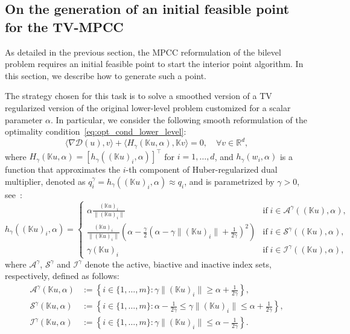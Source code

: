 \documentclass[review,onefignum,onetabnum]{siamonline190516}
\newcommand{\R}{\mathbb{R}}
\newcommand{\Ical}{\mathcal{I}}
\newcommand{\Acal}{\mathcal{A}}
\newcommand{\Dcal}{\mathcal{D}}
\newcommand{\scalar}[2]{\langle #1 , #2 \rangle}
\begin{document}
\subsection{On the generation of an initial feasible point for the TV-MPCC}\label{subsec:tv_initial_feasible}
As detailed in the previous section, the MPCC reformulation of the bilevel problem requires an initial feasible point to start the interior point algorithm. In this section, we describe how to generate such a point.

The strategy chosen for this task is to solve a smoothed version of a TV regularized version of the original lower-level problem customized for a scalar parameter $\alpha$. In particular, we consider the following smooth reformulation of the optimality condition~\cref{eq:opt_cond_lower_level}:
\begin{equation*}
    \scalar{\nabla \Dcal(u)}{v} + \scalar{H_\gamma(\mathbb{K}u,\alpha)}{\mathbb{K}v} = 0,
    \quad\forall v\in\R^d,
\end{equation*}
where $H_\gamma(\mathbb{K}u,\alpha) = [h_\gamma((\mathbb{K}u)_i,\alpha)]^\top$ for $i=1,\ldots,d$, and $h_\gamma(w_i,\alpha)$ is a function that approximates the $i$-th component of Huber-regularized dual multiplier, denoted as $q_i^\gamma = h_\gamma((\mathbb{K}u)_i,\alpha)\approx q_i$, and is parametrized by $\gamma>0$, see~\cite{de2012optimization}:
\begin{equation*}
    h_\gamma((\mathbb{K}u)_i,\alpha)=
    \begin{cases}
          \alpha\frac{(\mathbb{K}u)_i}{\|(\mathbb{K}u)_i\|}&\text{if}\;i\in\mathcal{A}^{\gamma}((\mathbb{K}u),\alpha), \\
          \frac{(\mathbb{K}u)_i}{\|(\mathbb{K}u)_i\|}\left(\alpha-\frac{\gamma}{2}\left(\alpha-\gamma\|(\mathbb{K}u)_i\|+\frac{1}{2\gamma}\right)^2\right)&\text{if}\;i\in\mathcal{S}^{\gamma}((\mathbb{K}u),\alpha),\\
          \gamma(\mathbb{K}u)_i & \text{if}\;i\in\mathcal{I}^{\gamma}((\mathbb{K}u),\alpha),
    \end{cases}
\end{equation*}
where $\Acal^\gamma$, $\mathcal{S}^\gamma$ and $\Ical^\gamma$ denote the active, biactive and inactive index sets, respectively, defined as follows:
\begin{align*}
  \mathcal{A}^{\gamma}(\mathbb{K}u,\alpha)&:=\left\{i\in\{1,\ldots,m\}:\gamma\|(\mathbb{K}u)_i\|\geq \alpha+\frac{1}{2\gamma}\right\},\\
  \mathcal{S}^{\gamma}(\mathbb{K}u,\alpha)&:=\left\{i\in\{1,\ldots,m\}:\alpha-\frac{1}{2\gamma}\leq\gamma\|(\mathbb{K}u)_i\|\leq \alpha+\frac{1}{2\gamma}\right\},\\
  \mathcal{I}^{\gamma}(\mathbb{K}u,\alpha)&:=\left\{i\in\{1,\ldots,m\}:\gamma\|(\mathbb{K}u)_i\|\leq \alpha-\frac{1}{2\gamma}\right\}.
\end{align*}
\end{document}
